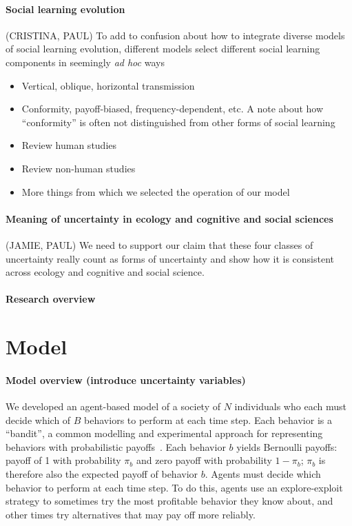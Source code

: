 \documentclass[letterpaper,11.5pt]{scrartcl}
\begin{document}
\paragraph{Social learning evolution} (CRISTINA, PAUL)
To add to confusion about how to integrate diverse models of social learning
evolution, different models select different social learning components in
seemingly \emph{ad hoc} ways 
\begin{itemize}
  \item 
    Vertical, oblique, horizontal transmission
  \item
    Conformity, payoff-biased, frequency-dependent, etc. A note about how
    ``conformity'' is often not distinguished from other forms of social learning
  \item
    Review human studies
  \item
    Review non-human studies~\cite{Leris2016,Aplin2017,Avargues-Weber2018,Baracchi2018}
  \item
    More things from which we selected the operation of our model
\end{itemize}

\paragraph{Meaning of uncertainty in ecology and cognitive and social sciences} (JAMIE, PAUL)
We need to support our claim that these four classes of uncertainty really 
count as forms of uncertainty and show how it is consistent across ecology and
cognitive and social science.

\paragraph{Research overview}

\section{Model}

\paragraph{Model overview (introduce uncertainty variables)}

We developed an agent-based model of a society of $N$ individuals who each must decide
which of $B$ behaviors to perform at each time step. Each behavior is a ``bandit'',
a common modelling and experimental approach for representing behaviors with
probabilistic payoffs~\cite{SuttonBartoBook,McElreath2005,Rendell2010,Schulz2019}. 
Each behavior $b$ yields Bernoulli payoffs: payoff of 1 with probability $\pi_b$ and 
zero payoff with probability $1 - \pi_b$; 
$\pi_b$ is therefore also the expected payoff of behavior $b$. Agents must
decide which behavior to perform at each time step. To do this, agents 
use an explore-exploit strategy to sometimes try the most profitable behavior
they know about, and other times try alternatives that may pay off more reliably. 
\end{document}

